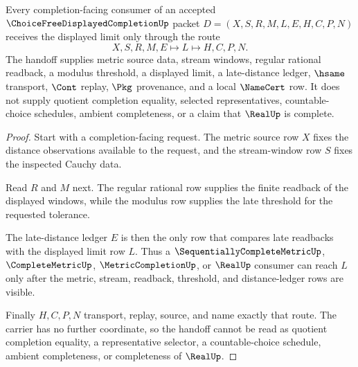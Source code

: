 \begin{theorem}
\label{thm:choice-free-displayed-completion-limit-handoff}
Every completion-facing consumer of an accepted $\ChoiceFreeDisplayedCompletionUp$ packet $D=(X,S,R,M,L,E,H,C,P,N)$ receives the displayed limit only through the route
$$
X,S,R,M,E \longmapsto L \longmapsto H,C,P,N .
$$
The handoff supplies metric source data, stream windows, regular rational readback, a modulus threshold, a displayed limit, a late-distance ledger, $\hsame$ transport, $\Cont$ replay, $\Pkg$ provenance, and a local $\NameCert$ row. It does not supply quotient completion equality, selected representatives, countable-choice schedules, ambient completeness, or a claim that $\RealUp$ is complete.
\end{theorem}
\begin{proof}
Start with a completion-facing request. The metric source row $X$ fixes the distance observations available to the request, and the stream-window row $S$ fixes the inspected Cauchy data.

Read $R$ and $M$ next. The regular rational row supplies the finite readback of the displayed windows, while the modulus row supplies the late threshold for the requested tolerance.

The late-distance ledger $E$ is then the only row that compares late readbacks with the displayed limit row $L$. Thus a $\SequentiallyCompleteMetricUp$, $\CompleteMetricUp$, $\MetricCompletionUp$, or $\RealUp$ consumer can reach $L$ only after the metric, stream, readback, threshold, and distance-ledger rows are visible.

Finally $H,C,P,N$ transport, replay, source, and name exactly that route. The carrier has no further coordinate, so the handoff cannot be read as quotient completion equality, a representative selector, a countable-choice schedule, ambient completeness, or completeness of $\RealUp$.
\end{proof}



